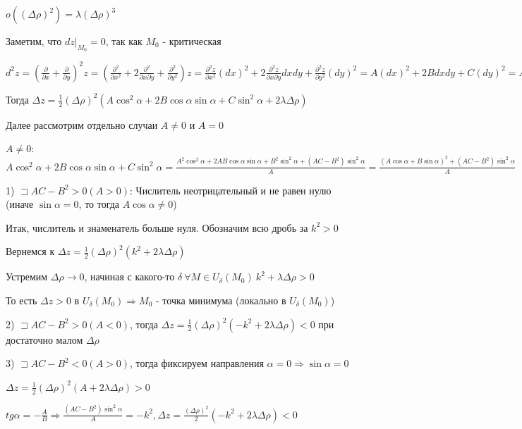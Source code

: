 \documentclass[12pt]{article}
\begin{document}
    $o((\Delta \rho)^2) = \lambda (\Delta \rho)^3$

    Заметим, что $dz |_{M_0} = 0$, так как $M_0$ - критическая

    $d^2 z = \left(\frac{\partial}{\partial x} + \frac{\partial}{\partial y}\right)^2 z = \left(\frac{\partial^2}{\partial x^2} + 2 \frac{\partial^2}{\partial x \partial y} + \frac{\partial^2}{\partial y^2}\right) z =
    \frac{\partial^2 z}{\partial x^2} (dx)^2 + 2 \frac{\partial^2 z}{\partial x \partial y} dxdy + \frac{\partial^2 z}{\partial y^2} (dy)^2 = A (dx)^2 + 2B dxdy + C(dy)^2 =
    A(\Delta \rho)^2 \cos^2\alpha + 2B (\Delta \rho)^2 \cos\alpha\sin\alpha + C(\Delta \rho)^2 \sin^2\alpha$

    Тогда $\Delta z = \frac{1}{2} (\Delta \rho)^2 (A\cos^2\alpha + 2B\cos\alpha\sin\alpha + C\sin^2\alpha + 2\lambda \Delta \rho)$

    Далее рассмотрим отдельно случаи $A \neq 0$ и $A = 0$

    $A \neq 0$: $A\cos^2\alpha + 2B\cos\alpha\sin\alpha + C\sin^2\alpha = \frac{A^2\cos^2\alpha + 2AB\cos\alpha\sin\alpha + B^2\sin^2\alpha + (AC - B^2)\sin^2\alpha}{A} =
    \frac{(A\cos\alpha + B\sin\alpha)^2 + (AC - B^2)\sin^2\alpha}{A}$

    1) $\sqsupset AC - B^2 > 0 (A > 0)$: Числитель неотрицательный и не равен нулю (иначе $\sin\alpha = 0$, то тогда $A\cos\alpha \neq 0$)

    Итак, числитель и знаменатель больше нуля. Обозначим всю дробь за $k^2 > 0$

    Вернемся к $\Delta z = \frac{1}{2}(\Delta \rho)^2 (k^2 + 2\lambda\Delta\rho)$

    Устремим $\Delta \rho \rightarrow 0$, начиная с какого-то $\delta \ \forall M \in U_\delta(M_0) \ k^2 + \lambda\Delta\rho > 0$

    То есть $\Delta z > 0$ в $U_\delta(M_0) \Longrightarrow M_0$ - точка минимума (локально в $U_\delta(M_0)$)

    2) $\sqsupset AC - B^2 > 0 (A < 0)$, тогда $\Delta z = \frac{1}{2}(\Delta \rho)^2 (-k^2 + 2\lambda\Delta\rho) < 0$ при достаточно малом $\Delta \rho$

    3) $\sqsupset AC - B^2 < 0 (A > 0)$, тогда фиксируем направления $\alpha = 0 \Longrightarrow \sin\alpha = 0$

    $\Delta z = \frac{1}{2}(\Delta \rho)^2 (A + 2\lambda\Delta\rho) > 0$

    $tg \alpha = -\frac{A}{B} \Longrightarrow \frac{(AC - B^2)\sin^2\alpha}{A} = -k^2, \Delta z = \frac{(\Delta \rho)^2}{2}(-k^2 + 2\lambda\Delta\rho) < 0$
\end{document}
